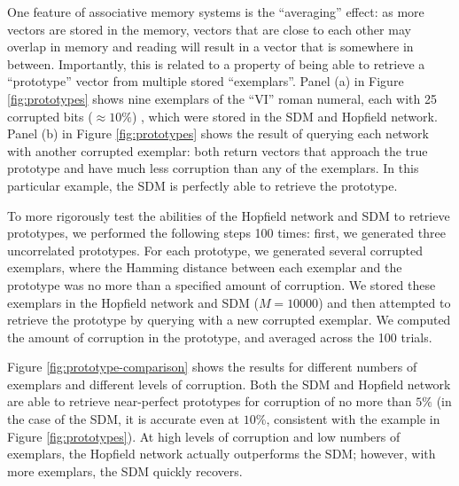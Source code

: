 \documentclass[10pt,letterpaper]{article}
\begin{document}
One feature of associative memory systems is the ``averaging'' effect:
as more vectors are stored in the memory, vectors that are close to
each other may overlap in memory and reading will result in a vector
that is somewhere in between. Importantly, this is related to a
property of being able to retrieve a ``prototype'' vector from
multiple stored ``exemplars''. Panel (a) in Figure \ref{fig:prototypes} shows nine exemplars of the ``VI'' roman numeral, each with 25 corrupted bits ($\approx10\%$) , which were
stored in the SDM and Hopfield network. Panel (b) in Figure \ref{fig:prototypes}
shows the result of querying each network with another corrupted
exemplar: both return vectors that approach the true prototype and
have much less corruption than any of the exemplars. In this
particular example, the SDM is perfectly able to retrieve the
prototype.

To more rigorously test the abilities of the Hopfield network and SDM
to retrieve prototypes, we performed the following steps 100 times:
first, we generated three uncorrelated prototypes. For each prototype,
we generated several corrupted exemplars, where the Hamming distance
between each exemplar and the prototype was no more than a specified
amount of corruption. We stored these exemplars in the Hopfield
network and SDM ($M=10000$) and then attempted to retrieve the
prototype by querying with a new corrupted exemplar. We computed the
amount of corruption in the prototype, and averaged across the 100
trials. 

Figure \ref{fig:prototype-comparison} shows the results for different
numbers of exemplars and different levels of corruption. Both the SDM
and Hopfield network are able to retrieve near-perfect prototypes for
corruption of no more than $5\%$ (in the case of the SDM, it is
accurate even at $10\%$, consistent with the example in
Figure \ref{fig:prototypes}). At high levels of corruption and low
numbers of exemplars, the Hopfield network actually outperforms the
SDM; however, with more exemplars, the SDM quickly recovers.


\end{document}
